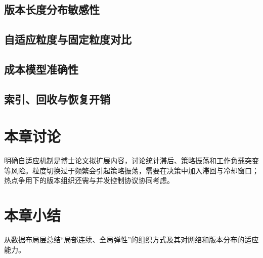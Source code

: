 \subsection{版本长度分布敏感性}
\subsection{自适应粒度与固定粒度对比}
\subsection{成本模型准确性}
\subsection{索引、回收与恢复开销}
\section{本章讨论}
明确自适应机制是博士论文拟扩展内容，讨论统计滞后、策略振荡和工作负载突变等风险。粒度切换过于频繁会引起策略振荡，需要在决策中加入滞回与冷却窗口\cite{zamanianChiller2020,binnigEnd2016}；热点争用下的版本组织还需与并发控制协议协同考虑\cite{guoReleasing2021,dingCentiman2015}。
\section{本章小结}
从数据布局层总结“局部连续、全局弹性”的组织方式及其对网络和版本分布的适应能力。
